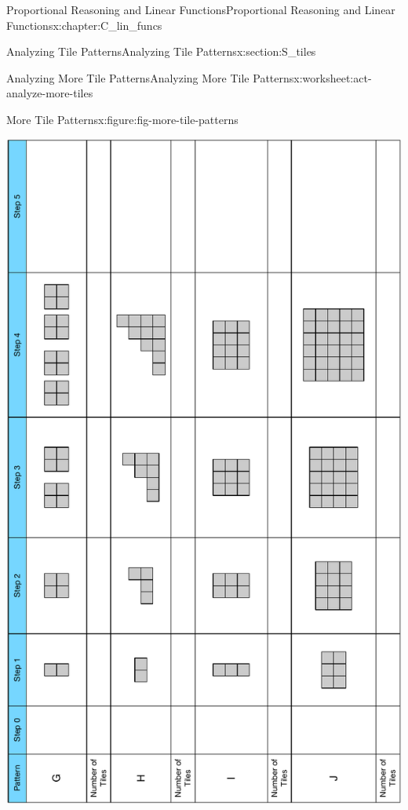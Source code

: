 \documentclass[oneside,10pt,]{book}
\numberwithin{equation}{chapter}
\begin{document}
\begin{chapterptx}{Proportional Reasoning and Linear Functions}{}{Proportional Reasoning and Linear Functions}{}{}{x:chapter:C_lin_funcs}
\begin{sectionptx}{Analyzing Tile Patterns}{}{Analyzing Tile Patterns}{}{}{x:section:S_tiles}
\begin{worksheet-subsection}{Analyzing More Tile Patterns}{}{Analyzing More Tile Patterns}{}{}{x:worksheet:act-analyze-more-tiles}
\begin{figureptx}{More Tile Patterns}{x:figure:fig-more-tile-patterns}{}
\begin{image}{0.1}{0.8}{0.1}
\includegraphics[width=\linewidth]{external/more-tile-patterns.pdf}
\end{image}%
\tcblower
\end{figureptx}%
\end{worksheet-subsection}
\restoregeometry
\end{sectionptx}
\end{chapterptx}
%
%
\typeout{************************************************}
\typeout{************************************************}
%
\end{document}
